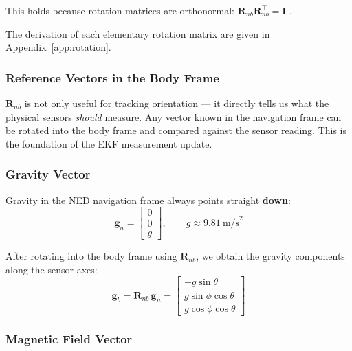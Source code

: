 \documentclass[12pt,a4paper]{article}
\begin{document}
This holds because rotation matrices are orthonormal:
$\bm{R}_{nb}\bm{R}_{nb}^{\top} = \bm{I}$ \citep{groves2013principles}.

\begin{notebox}
  The derivation of each elementary rotation matrix are given in
  Appendix~\ref{app:rotation}.
\end{notebox}

\subsubsection{Reference Vectors in the Body Frame}
\label{sec:ref_vectors}
$\bm{R}_{nb}$ is not only useful for tracking orientation — it directly tells
us what the physical sensors \emph{should} measure. Any vector known in the
navigation frame can be rotated into the body frame and compared against the
sensor reading. This is the foundation of the EKF measurement update.

\subsubsection{Gravity Vector}
\label{sec:gravity_vector}

Gravity in the NED navigation frame always points straight \textbf{down}:
\begin{equation}
  \bm{g}_n = \begin{bmatrix} 0 \\ 0 \\ g \end{bmatrix}, \qquad
  g \approx 9.81\ \text{m/s}^2
\end{equation}

After rotating into the body frame using $\bm{R}_{nb}$, we obtain the
gravity components along the sensor axes:
\begin{equation}
  \bm{g}_b = \bm{R}_{nb}\,\bm{g}_n =
  \begin{bmatrix}
    -g\sin\theta \\
     g\sin\phi\cos\theta \\
     g\cos\phi\cos\theta
  \end{bmatrix}
  \label{eq:gravity_body}
\end{equation}

\subsubsection{Magnetic Field Vector}
\label{sec:mag_vector}
\end{document}
